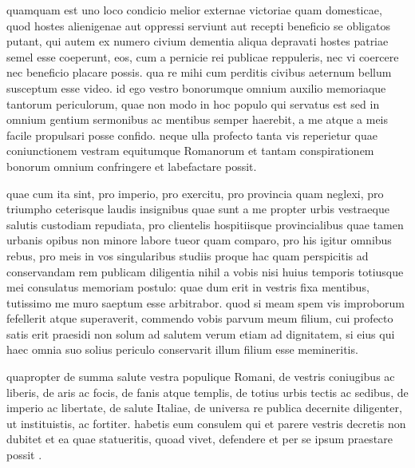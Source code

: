  quamquam est uno loco condicio melior externae victoriae quam domesticae, quod hostes alienigenae aut oppressi serviunt aut recepti beneficio se obligatos putant, qui autem ex numero civium dementia aliqua depravati hostes patriae semel esse coeperunt, eos, cum a pernicie rei publicae reppuleris, nec vi coercere nec beneficio placare possis. qua re mihi cum perditis civibus aeternum bellum susceptum esse video. id ego vestro bonorumque omnium auxilio memoriaque tantorum periculorum, quae non modo in hoc populo qui servatus est sed in omnium gentium sermonibus ac mentibus semper haerebit, a me atque a meis facile propulsari posse confido. neque ulla profecto tanta vis reperietur quae coniunctionem vestram equitumque Romanorum et tantam conspirationem bonorum omnium confringere et labefactare possit.

 quae cum ita sint, pro imperio, pro exercitu, pro provincia quam neglexi, pro triumpho ceterisque laudis insignibus quae sunt a me propter urbis vestraeque salutis custodiam repudiata, pro clientelis hospitiisque provincialibus quae tamen urbanis opibus non minore labore tueor quam comparo, pro his igitur omnibus rebus, pro meis in vos singularibus studiis proque hac quam perspicitis ad conservandam rem publicam diligentia nihil a vobis nisi huius temporis totiusque mei consulatus memoriam postulo: quae dum erit in vestris fixa mentibus, tutissimo me muro saeptum esse arbitrabor. quod si meam spem vis improborum fefellerit atque superaverit, commendo vobis parvum meum filium, cui profecto satis erit praesidi non solum ad salutem verum etiam ad dignitatem, si eius qui haec omnia suo solius periculo conservarit illum filium esse memineritis.

 quapropter de summa salute vestra populique Romani, de vestris coniugibus ac liberis, de aris ac focis, de fanis atque templis, de totius urbis tectis ac sedibus, de imperio ac libertate, de salute Italiae, de universa re publica decernite diligenter, ut instituistis, ac fortiter. habetis eum consulem qui et parere vestris decretis non dubitet et ea quae statueritis, quoad vivet, defendere et per se ipsum praestare possit .
